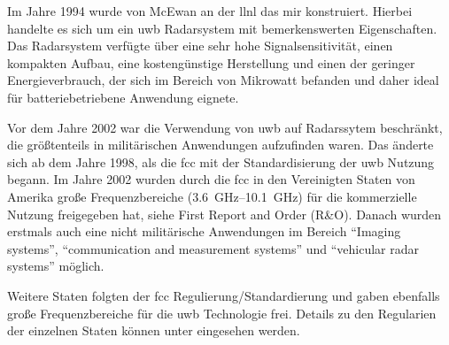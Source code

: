 

Im Jahre 1994 wurde von McEwan an der \gls{llnl} das \gls{mir} konstruiert. Hierbei handelte es sich um ein \gls{uwb} Radarsystem mit bemerkenswerten Eigenschaften. Das Radarsystem verfügte über eine sehr hohe Signalsensitivität, einen kompakten Aufbau, eine kostengünstige Herstellung und einen der geringer Energieverbrauch, der sich im Bereich von Mikrowatt befanden und daher ideal für batteriebetriebene Anwendung eignete. \cite{barrett2001technical}


Vor dem Jahre 2002 war die Verwendung von \gls{uwb} auf Radarssytem beschränkt, die größtenteils in militärischen Anwendungen aufzufinden waren. \cite{yang2004uwbcom} Das änderte sich ab dem Jahre 1998, als die \gls{fcc} mit der Standardisierung der \gls{uwb} Nutzung begann. Im Jahre 2002 wurden durch die \gls{fcc} in den Vereinigten Staten von Amerika große Frequenzbereiche (\SIrange{3.6}{10.1}{\GHz}) für die kommerzielle Nutzung freigegeben hat, siehe First Report and Order (R\&O). Danach wurden erstmals auch eine nicht militärische Anwendungen im Bereich ``Imaging systems'', ``communication and measurement systems'' und ``vehicular radar systems'' möglich. \cite{yang2004uwbcom}


Weitere Staten folgten der \gls{fcc} Regulierung/Standardierung und gaben ebenfalls große Frequenzbereiche für die \gls{uwb} Technologie frei. Details zu den Regularien der einzelnen Staten können unter \cite{decawave2015uwbreg} eingesehen werden.

